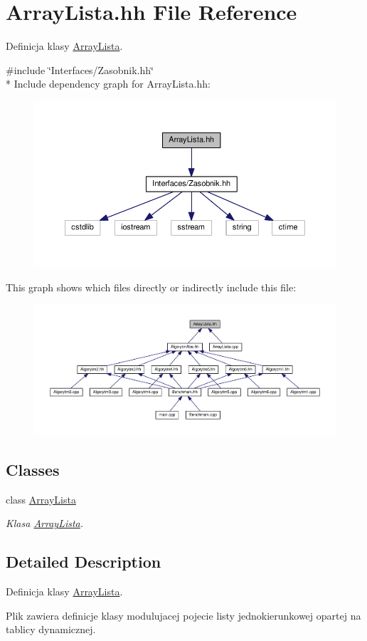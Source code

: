 \hypertarget{a00032}{}\section{Array\+Lista.\+hh File Reference}
\label{a00032}


Definicja klasy \hyperlink{a00008}{Array\+Lista}.  


{\ttfamily \#include \char`\"{}Interfaces/\+Zasobnik.\+hh\char`\"{}}\\*
Include dependency graph for Array\+Lista.\+hh\+:
\nopagebreak
\begin{figure}[H]
\begin{center}
\leavevmode
\includegraphics[width=350pt]{a00074}
\end{center}
\end{figure}
This graph shows which files directly or indirectly include this file\+:
\nopagebreak
\begin{figure}[H]
\begin{center}
\leavevmode
\includegraphics[width=350pt]{a00075}
\end{center}
\end{figure}
\subsection*{Classes}
\begin{DoxyCompactItemize}
\item 
class \hyperlink{a00008}{Array\+Lista}
\begin{DoxyCompactList}\small\item\em Klasa \hyperlink{a00008}{Array\+Lista}. \end{DoxyCompactList}\end{DoxyCompactItemize}


\subsection{Detailed Description}
Definicja klasy \hyperlink{a00008}{Array\+Lista}. 

Plik zawiera definicje klasy modulujacej pojecie listy jednokierunkowej opartej na tablicy dynamicznej. 